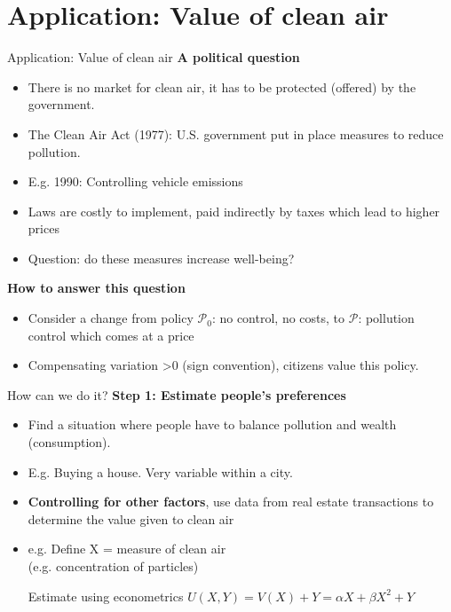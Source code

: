 \documentclass[handout]{beamer}
\newcommand{\mcl}{\mathcal}
\newenvironment{iPar}[1]{\textbf{#1} \begin{itemize}}{\end{itemize}}
\newcommand{\mdp}{\medskip \pause}
\begin{document}
\section{Application: Value of clean air}
\begin{frame}{Application: Value of clean air }
\begin{iPar}{A political question}
\item There is no market for clean air, it has to be protected (offered) by the government.
\item The Clean Air Act (1977): U.S. government put in place measures to reduce pollution.
\item E.g. 1990: Controlling vehicle emissions
\item Laws are costly to implement, paid indirectly by taxes which lead to higher prices
\item Question: do these measures increase well-being?
\end{iPar}\mdp

\begin{iPar}{How to answer this question}
\item Consider a change from policy $\mcl P_0$: no control, no costs, to $\mcl P$: pollution control which comes at a price
\item Compensating variation >0 (sign convention), citizens value this policy.
\end{iPar}
\end{frame}


\begin{frame}{How can we do it?}
\begin{iPar}{Step 1: Estimate people's preferences}
\item Find a situation where people have to balance pollution and wealth (consumption).
\item E.g. Buying a house. Very variable within a city.\mdp
\item \textbf{Controlling for other factors}, use data from real estate transactions to determine the value given to clean air
\item e.g. Define X = measure of clean air \\ (e.g. concentration of particles) \pause

Estimate using econometrics $U(X, Y) = V(X) + Y = \alpha X + \beta X^2 +Y$

\end{iPar}\mdp 

\end{frame}
\end{document}
